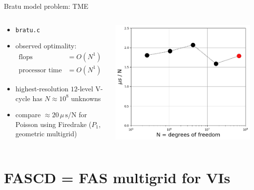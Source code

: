 \documentclass[svgnames,
               hyperref={colorlinks,citecolor=DeepPink4,linkcolor=FireBrick,urlcolor=Maroon},
               usepdftitle=false]  %
               {beamer}
\begin{document}
\begin{frame}{Bratu model problem: TME}

\begin{columns}
\begin{column}{0.45\textwidth}
\begin{itemize}
\item \texttt{bratu.c}
\item observed optimality:
\begin{align*}
\text{flops} &= O(N^1) \\
\text{processor time} &= O(N^1)
\end{align*}
\item highest-resolution {\color{FireBrick} $12$-level V-cycle} has $N\approx 10^8$ unknowns
\item compare $\approx 20\,\mu\,\text{s}/\text{N}$ for Poisson using Firedrake ($P_1$, geometric multigrid)
\end{itemize}
\end{column}
\begin{column}{0.55\textwidth}
\includegraphics[width=\textwidth]{../talk-dms/figs/bratu-time.png}
\end{column}
\end{columns}
\end{frame}


\section{FASCD = FAS multigrid for VIs}
\end{document}

